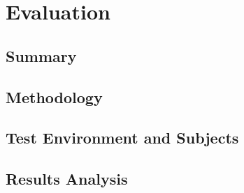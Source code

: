 \chapter{Evaluation}
\label{sec:evaluation}

\section*{Summary}


\section{Methodology}

\section{Test Environment and Subjects}

\section{Results Analysis} 